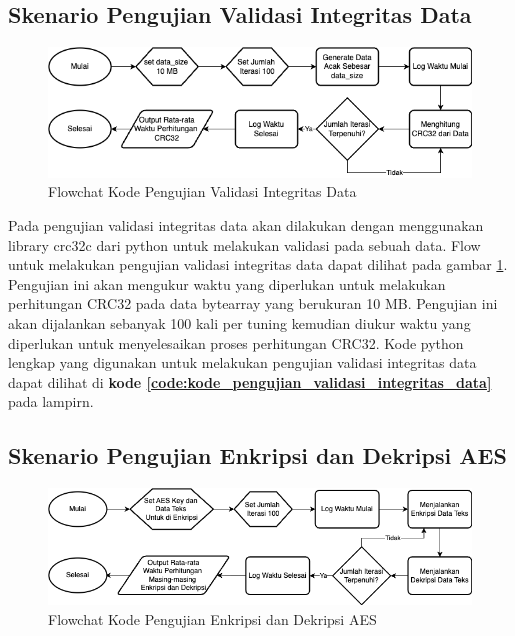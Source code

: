 \subsection{Skenario Pengujian Validasi Integritas Data}
\begin{figure}
    \centering
    \includegraphics[width=1\textwidth]
    {assets/pics/code-flowchart/flowchart_crc32.png}
    \caption{Flowchat Kode Pengujian Validasi Integritas Data}
    \label{fig:flowchart_crc32}
\end{figure}

Pada pengujian validasi integritas data akan dilakukan dengan menggunakan library crc32c dari python untuk melakukan validasi pada sebuah data. Flow untuk melakukan pengujian validasi integritas data dapat dilihat pada gambar \ref{fig:flowchart_crc32}. Pengujian ini akan mengukur waktu yang diperlukan untuk melakukan perhitungan CRC32 pada data bytearray yang berukuran 10 MB. Pengujian ini akan dijalankan sebanyak 100 kali per tuning kemudian diukur waktu yang diperlukan untuk menyelesaikan proses perhitungan CRC32. Kode python lengkap yang digunakan untuk melakukan pengujian validasi integritas data dapat dilihat di \textbf{kode \ref{code:kode_pengujian_validasi_integritas_data}} pada lampirn.

\subsection{Skenario Pengujian Enkripsi dan Dekripsi AES}
\begin{figure}
    \centering
    \includegraphics[width=1\textwidth]
    {assets/pics/code-flowchart/flowchart_aes.png}
    \caption{Flowchat Kode Pengujian Enkripsi dan Dekripsi AES}
    \label{fig:flowchart_aes}
\end{figure}


